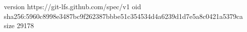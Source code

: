 version https://git-lfs.github.com/spec/v1
oid sha256:5960c8998e3487bc9f262387bbbe51c354534d4a6239d1d7e5a8c0421a5379ca
size 29178
